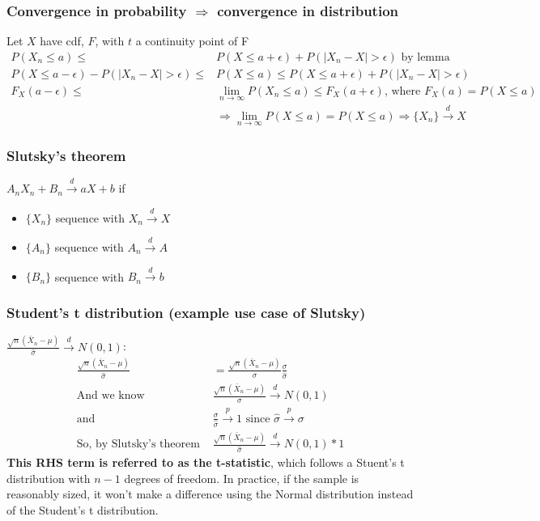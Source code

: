 \documentclass{article}
\newcommand{\abs}[1]{\lvert#1\rvert}
\begin{document}
\subsubsection{Convergence in probability $\Longrightarrow$ convergence in distribution}
Let $X$ have cdf, $F$, with $t$ a continuity point of F
\begin{align*}
    P(X_n \leq a) \leq& P(X \leq a + \epsilon) + P( \abs{X_n - X} > \epsilon) \textrm{ by lemma}\\
    P(X \leq a - \epsilon) - P(\abs{X_n - X} > \epsilon) \leq& P(X \leq a) \leq P(X \leq a + \epsilon) + P(\abs{X_n - X} > \epsilon)\\
    F_X(a - \epsilon) \leq& \lim_{n\rightarrow \infty} P(X_n \leq a) \leq F_X(a + \epsilon) \textrm{, where } F_X(a) = P(X \leq a)\\
    &\Longrightarrow \lim_{n \rightarrow \infty} P(X \leq a) = P(X \leq a) \Longrightarrow \{X_n \} \overset{d}{\longrightarrow} X
\end{align*}

\subsubsection{Slutsky's theorem}
$A_nX_n + B_n \overset{d}{\longrightarrow} aX + b$ if
\begin{itemize}
    \item $\{X_n\}$ sequence with $X_n \overset{d}{\longrightarrow} X$
    \item $\{A_n\}$ sequence with $A_n \overset{d}{\longrightarrow} A$
    \item $\{B_n\}$ sequence with $B_n \overset{d}{\longrightarrow} b$
\end{itemize}
\subsubsection{Student's t distribution (example use case of Slutsky)} 
$\frac{\sqrt{n}(\bar{X}_n - \mu)}{\hat{\sigma}} \overset{d}{\longrightarrow} N(0, 1)$:
\begin{align*}
    \frac{\sqrt{n}(\bar{X}_n - \mu)}{\hat{\sigma}} &= \frac{\sqrt{n}(\bar{X}_n - \mu)}{\sigma} \frac{\sigma}{\hat{\sigma}}\\
    \textrm{And we know }& \frac{\sqrt{n}(\bar{X}_n - \mu)}{\sigma} \overset{d}{\longrightarrow} N(0, 1)\\
    \textrm{and } & \frac{\sigma}{\hat{\sigma}} \overset{p}{\longrightarrow} 1 \textrm{ since } \hat{\sigma} \overset{p}{\longrightarrow} \sigma\\
    \textrm{So, by Slutsky's theorem } &\frac{\sqrt{n}(\bar{X}_n - \mu)}{\hat{\sigma}} \overset{d}{\longrightarrow} N(0, 1) * 1
\end{align*}
\textbf{This RHS term is referred to as the t-statistic}, which follows a Stuent's t distribution with $n-1$ degrees of freedom. In practice, if the sample is reasonably sized, it won't make a difference using the Normal distribution instead of the Student's t distribution. 
\end{document}

